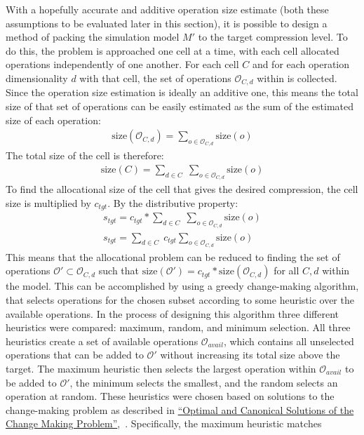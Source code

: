 With a hopefully accurate and additive operation size estimate (both these assumptions to be evaluated later in this section),
it is possible to design a method of packing the simulation model $M'$ to the target compression level. To do this, the problem is approached one cell at a time, with each cell allocated
operations independently of one another. For each cell $C$ and for each operation dimensionality $d$ with that cell,
the set of operations $\mathcal{O}_{C,d}$ within is collected. Since the operation size estimation is ideally an additive one,
this means the total size of that set of operations can be easily estimated as the sum of the estimated size of each operation:
\newcommand{\size}{\text{size}}
\begin{align}
	\size(\mathcal{O}_{C,d}) = \sum_{o \in \mathcal{O}_{C,d}}{\size(o)} \label{eq:additive sizing}
\end{align}
The total size of the cell is therefore:
\begin{align}
	\size(C) = \sum_{d \in C} \; \sum_{o \in \mathcal{O}_{C,d}}{\size(o)}
\end{align}
To find the allocational size of the cell that gives the desired compression, the cell size is multiplied by
$c_{tgt}$. By the distributive property:
\begin{align}
	s_{tgt} = c_{tgt} * \sum_{d \in C} \; \sum_{o \in \mathcal{O}_{C,d}}{\size(o)} \\
	s_{tgt} = \sum_{d \in C} \; c_{tgt} \sum_{o \in \mathcal{O}_{C,d}}{\size(o)}
\end{align}
This means that the allocational problem can be reduced to finding the set of operations
$\mathcal{O}' \subset \mathcal{O}_{C,d}$ such that $\size(\mathcal{O}')=c_{tgt} * \size(\mathcal{O}_{C,d})$ for all
$C, d$ within the model. This can be accomplished by using a greedy change-making algorithm, that selects operations for
the chosen subset according to some heuristic over the available operations. In the process of designing this algorithm
three different heuristics were compared: maximum, random, and minimum selection. All three heuristics create a set of available operations $\mathcal{O}_{avail}$,
which contains all unselected operations
that can be added to $\mathcal{O}'$ without increasing its total size above the target. The maximum heuristic then selects
the largest operation within $\mathcal{O}_{avail}$ to be added to $\mathcal{O}'$, the minimum selects the smallest, and
the random selects an operation at random. These heuristics were chosen
based on solutions to the change-making problem as described in \hyperlink{cite.martello1980}{``Optimal and
Canonical Solutions of the Change Making Problem''},~\cite{martello1980}. Specifically, the maximum heuristic matches
